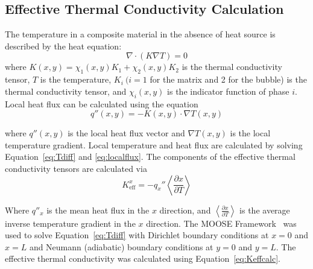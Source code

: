 \subsection{Effective Thermal Conductivity Calculation}
\label{subsec:Keffcalc}
The temperature in a composite material in the absence of heat source is described by the heat equation:
\begin{equation}
\nabla \cdot \left(K\nabla T \right)=0
\label{eq:Tdiff}
\end{equation}
where $K(x,y)=\chi_1(x,y)K_1 + \chi_2(x,y)K_2$ is the thermal conductivity tensor, $T$ is the temperature, $K_i\ { }(i=1$ for the matrix and 2 for the bubble) is the thermal conductivity tensor, and $\chi_i(x,y)$ is the indicator function of phase $i$. Local heat flux can be calculated using the equation
\begin{equation}
\label{eq:localflux}
q''(x,y) = -K(x,y) \cdot \nabla T(x,y)
\end{equation}


where $q''(x,y)$ is the local heat flux vector and $\nabla T(x,y)$ is the local temperature gradient. Local temperature and heat flux are calculated by solving Equation~\eqref{eq:Tdiff} and \eqref{eq:localflux}. The components of the effective thermal conductivity tensors are calculated via 
\begin{equation}
\label{eq:Keffcalc}
K_{\text{eff}}^x = -q_x''\left<\frac{\partial x}{\partial T}\right>
\end{equation}


Where $q''_x$ is the mean heat flux in the $x$ direction, and $\left<\frac{\partial x}{\partial T}\right>$ is the average inverse temperature gradient in the $x$ direction. The MOOSE Framework~\cite{gaston2009moose} was used to solve Equation~\eqref{eq:Tdiff} with Dirichlet boundary conditions at $x=0$ and $x=L$ and Neumann (adiabatic) boundary conditions at $y=0$ and $y=L$. The effective thermal conductivity was calculated using Equation~\eqref{eq:Keffcalc}.



